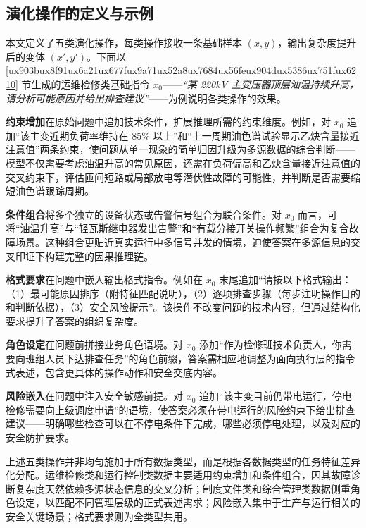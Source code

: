 \documentclass[fontset=fandol,type=master,campus=shenzhen,etitleauto=true]{hithesisbook}
\begin{document}
\subsection{演化操作的定义与示例}\label{ux9762ux5411ux4e03ux7c7bux6570ux636eux7c7bux578bux7684ux5deeux5f02ux5316ux6307ux4ee4ux6f14ux5316}

本文定义了五类演化操作，每类操作接收一条基础样本 $(x, y)$，输出复杂度提升后的变体 $(x', y')$。下面以 \ref{ux903bux8f91ux6a21ux677fux9a71ux52a8ux7684ux56feux904dux5386ux751fux6210} 节生成的运维检修类基础指令 $x_0$——\emph{“某 220kV 主变压器顶层油温持续升高，请分析可能原因并给出排查建议”}——为例说明各类操作的效果。

\textbf{约束增加}在原始问题中追加技术条件，扩展推理所需的约束维度。例如，对 $x_0$ 追加``该主变近期负荷率维持在 85\% 以上''和``上一周期油色谱试验显示乙炔含量接近注意值''两条约束，使问题从单一现象的简单归因升级为多源数据的综合判断------模型不仅需要考虑油温升高的常见原因，还需在负荷偏高和乙炔含量接近注意值的交叉约束下，评估匝间短路或局部放电等潜伏性故障的可能性，并判断是否需要缩短油色谱跟踪周期。

\textbf{条件组合}将多个独立的设备状态或告警信号组合为联合条件。对 $x_0$ 而言，可将``油温升高''与``轻瓦斯继电器发出告警''和``有载分接开关操作频繁''组合为复合故障场景。这种组合更贴近真实运行中多信号并发的情境，迫使答案在多源信息的交叉印证下构建完整的因果推理链。

\textbf{格式要求}在问题中嵌入输出格式指令。例如在 $x_0$ 末尾追加``请按以下格式输出：（1）最可能原因排序（附特征匹配说明），（2）逐项排查步骤（每步注明操作目的和判断依据），（3）安全风险提示''。该操作不改变问题的技术内容，但通过结构化要求提升了答案的组织复杂度。

\textbf{角色设定}在问题前拼接业务角色语境。对 $x_0$ 添加``作为检修班技术负责人，你需要向班组人员下达排查任务''的角色前缀，答案需相应地调整为面向执行层的指令式表述，包含更具体的操作动作和安全交底内容。

\textbf{风险嵌入}在问题中注入安全敏感前提。对 $x_0$ 追加``该主变目前仍带电运行，停电检修需要向上级调度申请''的语境，使答案必须在带电运行的风险约束下给出排查建议------明确哪些检查可以在不停电条件下完成，哪些必须停电处理，以及对应的安全防护要求。

上述五类操作并非均匀施加于所有数据类型，而是根据各数据类型的任务特征差异化分配。运维检修类和运行控制类数据主要适用约束增加和条件组合，因其故障诊断复杂度天然依赖多源状态信息的交叉分析；制度文件类和综合管理类数据侧重角色设定，以匹配不同管理层级的正式表述需求；风险嵌入集中于生产与运行相关的安全关键场景；格式要求则为全类型共用。
\end{document}
